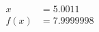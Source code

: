 \documentclass[preview]{standalone}
\begin{document}
\begin{align*}
x &= 5.0011\\f(x) &= 7.9999998
\end{align*}
\end{document}
